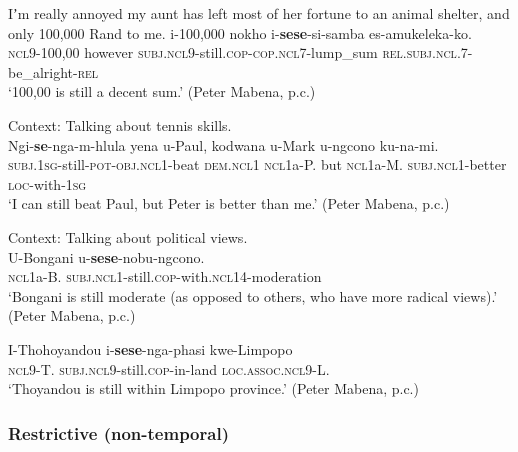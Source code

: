 \begin{exe}
	\ex\label{exAppendixSouthernNdebeleMarginal1}
	\begin{xlist}
	 Iʼm really annoyed my aunt has left most of her fortune to an animal shelter, and only 100,000 Rand to me.
	\gll i-100,000 nokho i-\textbf{sese}-si-samba es-amukeleka-ko.\\
	\textsc{ncl}9-100,00 however \textsc{subj}.\textsc{ncl}9-still.\textsc{cop}-\textsc{cop}.\textsc{ncl}7-lump\_sum \textsc{rel}.\textsc{subj}.\textsc{ncl}.7-be\_alright-\textsc{rel}\\
	\glt \lq 100,00 is still a decent sum.' (Peter Mabena, p.c.)
\end{xlist}	

	\ex\label{exAppendixSouthernNdebeleMarginal2}
	Context: Talking about tennis skills.\\
     \gll Ngi-\textbf{se}-nga-m-hlula yena u-Paul, kodwana u-Mark u-ngcono ku-na-mi.\\
     \textsc{subj}.1\textsc{sg}-still-\textsc{pot}-\textsc{obj}.\textsc{ncl}1-beat \textsc{dem}.\textsc{ncl}1 \textsc{ncl}1a-P. but \textsc{ncl}1a-M. \textsc{subj}.\textsc{ncl}1-better \textsc{loc}-with-1\textsc{sg}\\
     \glt \lq I can still beat Paul, but Peter is better than me.' (Peter Mabena, p.c.)
	
	\ex\label{exAppendixSouthernNdebeleMarginal3}
	Context: Talking about political views.\\
	\gll U-Bongani u-\textbf{sese}-nobu-ngcono.\\
	\textsc{ncl}1a-B. \textsc{subj}.\textsc{ncl}1-still.\textsc{cop}-with.\textsc{ncl}14-moderation\\
	\glt \lq Bongani is still moderate (as opposed to others, who have more radical views).' (Peter Mabena, p.c.)

	\ex\label{exAppendixSouthernNdebeleMarginal4}
	\gll I-Thohoyandou i-\textbf{sese}-nga-phasi kwe-Limpopo\\
\textsc{ncl}9-T. \textsc{subj}.\textsc{ncl}9-still.\textsc{cop}-in-land \textsc{loc}.\textsc{assoc}.\textsc{ncl}9-L.\\
	\glt \lq Thoyandou is still within Limpopo province.' (Peter Mabena, p.c.)
\end{exe}

\subsubsection{Restrictive (non-temporal)}
